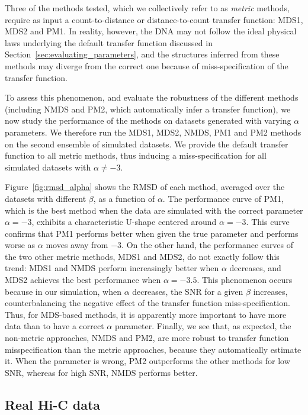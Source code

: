 Three of the methods tested, which we collectively refer to as \emph{metric} methods, require as input a count-to-distance or distance-to-count transfer function: MDS1, MDS2 and PM1. In reality, however, the DNA may not follow the ideal physical laws underlying the default transfer function discussed in Section~\ref{sec:evaluating_parameters}, and the structures inferred from these methods may diverge from the correct one because of miss-specification of the transfer function.

To assess this phenomenon, and evaluate the robustness of the different methods (including NMDS and PM2, which automatically infer a transfer function), we now study
the performance of the methods on datasets generated with varying
$\alpha$ parameters. We therefore run the MDS1, MDS2, NMDS, PM1 and PM2 methods on the second
ensemble of simulated datasets. We provide the default transfer function to
all metric methods, thus inducing a miss-specification for all simulated
datasets with $\alpha\neq -3$.

Figure~\ref{fig:rmsd_alpha} shows the RMSD of each method, averaged
over the datasets with different $\beta$, as a function of $\alpha$.
The performance curve of PM1, which is the best method when the data
are simulated with the correct parameter $\alpha=-3$, exhibits a
characteristic U-shape centered around $\alpha = -3$. This curve
confirms that PM1 performs better when given the true parameter and
performs worse as $\alpha$ moves away from $-3$. On the other hand,
the performance curves of the two other metric methods, MDS1 and MDS2,
do not exactly follow this trend: MDS1 and NMDS perform increasingly
better when $\alpha$ decreases, and MDS2 achieves the best performance
when $\alpha = -3.5$. This phenomenon occurs because in our
simulation, when $\alpha$ decreases, the SNR for a given $\beta$
increases, counterbalancing the negative effect of the transfer
function miss-specification.  Thus, for MDS-based methods, it is
apparently more important to have more data than to have a correct
$\alpha$ parameter. Finally, we see that, as expected, the non-metric
approaches, NMDS and PM2, are more robust to transfer function
misspecification than the metric approaches, because they
automatically estimate it. When the parameter is wrong, PM2
outperforms the other methods for low SNR, whereas for high SNR, NMDS
performs better.

\subsection{Real Hi-C data}

